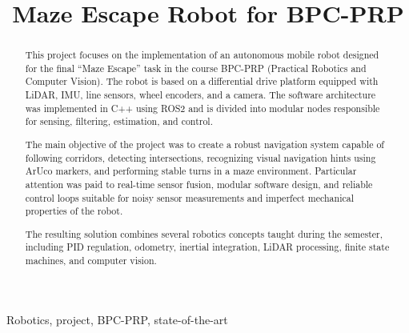 \documentclass[conference]{IEEEtran}
\begin{document}
\title{Maze Escape Robot for BPC-PRP}

\author{
\and
{}
}

\maketitle

\begin{abstract}
This project focuses on the implementation of an autonomous mobile robot designed for the final “Maze Escape” task in the course BPC-PRP (Practical Robotics and Computer Vision). The robot is based on a differential drive platform equipped with LiDAR, IMU, line sensors, wheel encoders, and a camera. The software architecture was implemented in C++ using ROS2 and is divided into modular nodes responsible for sensing, filtering, estimation, and control.

The main objective of the project was to create a robust navigation system capable of following corridors, detecting intersections, recognizing visual navigation hints using ArUco markers, and performing stable turns in a maze environment. Particular attention was paid to real-time sensor fusion, modular software design, and reliable control loops suitable for noisy sensor measurements and imperfect mechanical properties of the robot.

The resulting solution combines several robotics concepts taught during the semester, including PID regulation, odometry, inertial integration, LiDAR processing, finite state machines, and computer vision.
\end{abstract}

\begin{IEEEkeywords}
Robotics, project, BPC-PRP, state-of-the-art
\end{IEEEkeywords}





\end{document}
